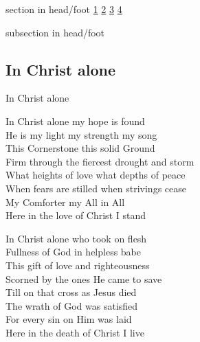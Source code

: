 \documentclass{beamer}
\begin{document}
{
{ 
 {
 \begin{beamercolorbox}[ht=4.5ex,dp=1.5ex,%
      leftskip=.3cm,rightskip=.3cm plus1fil]{section in head/foot}
 \fontsize{12}{25}\selectfont 
\hyperlink{In Christ alone[]1}{1}
\hyperlink{In Christ alone[]2}{2}
\hyperlink{In Christ alone[]3}{3}
\hyperlink{In Christ alone[]4}{4}
 
 \end{beamercolorbox}%
  \begin{beamercolorbox}[ht=2.5ex,dp=1.125ex,%
   leftskip=.3cm,rightskip=.3cm plus1fil]{subsection in head/foot}
   \insertauthor
 \end{beamercolorbox}%
 }
}
\subsection{ In Christ alone }

\hypertarget{In Christ alone[]1}{}
\begin{frame}{In Christ alone }
\fontsize{ 18 }{ 23 }\selectfont

In Christ alone my hope is found\\ 
He is my light my strength my song\\ 
This Cornerstone this solid Ground\\ 
Firm through the fiercest drought and storm\\ 
What heights of love what depths of peace\\ 
When fears are stilled when strivings cease\\ 
My Comforter my All in All\\ 
Here in the love of Christ I stand 

\end{frame}

\hypertarget{In Christ alone[]2}{}
\begin{frame}{}
\fontsize{ 18 }{ 23 }\selectfont

In Christ alone who took on flesh\\ 
Fullness of God in helpless babe\\ 
This gift of love and righteousness\\ 
Scorned by the ones He came to save\\ 
Till on that cross as Jesus died\\ 
The wrath of God was satisfied\\ 
For every sin on Him was laid\\ 
Here in the death of Christ I live 


\end{frame}}
\end{document}
